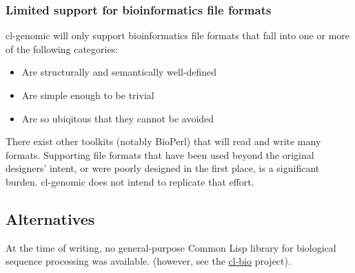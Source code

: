 \documentclass[a4paper, 12pt]{article}
\begin{document}
\subsubsection{Limited support for bioinformatics file formats}
\label{sec:bioformats}

cl-genomic will only support bioinformatics file formats that fall
into one or more of the following categories:

\begin{itemize}
\item Are structurally and semantically well-defined
\item Are simple enough to be trivial
\item Are so ubiqitous that they cannot be avoided
\end{itemize}

There exist other toolkits (notably BioPerl) that will read and write
many formats. Supporting file formats that have been used beyond the
original designers' intent, or were poorly designed in the first
place, is a significant burden. cl-genomic does not intend to
replicate that effort.


\subsection{Alternatives}
\label{sec:alternate}

At the time of writing, no general-purpose Common Lisp library for
biological sequence processing was available. (however, see the 
\href{http://common-lisp.net/project/cl-bio}{cl-bio} project).
\end{document}
